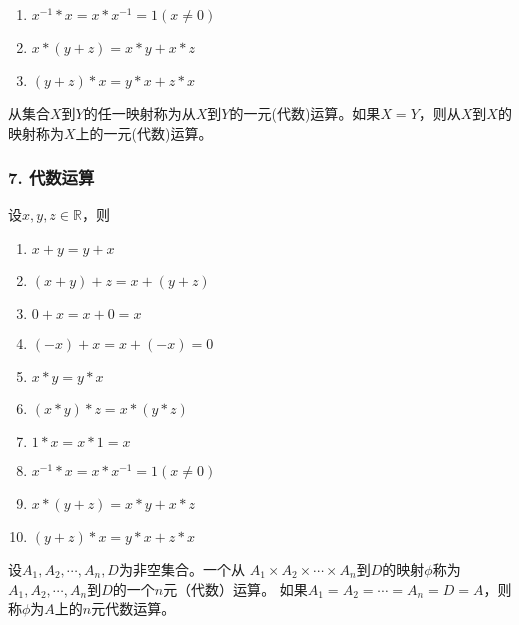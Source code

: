 \documentclass{beamer}
\begin{document}
\begin{CJK*}{UTF8}{gbsn}
\begin{frame}
\begin{minipage}[t]{0.49\linewidth}
\begin{block}{}
\begin{enumerate}
   \item   $x^{-1} * x = x * x^{-1} = 1(x\neq 0)$
   \item   $x* (y + z) = x * y + x * z$
   \item   $(y + z) * x = y * x + z * x$
    \end{enumerate}
  \end{block}\pause
\end{minipage}
\begin{minipage}[t]{0.49\linewidth}
  \begin{Def}
    从集合$X$到$Y$的任一映射称为从$X$到$Y$的\alert{一元(代数)运算}。如果$X=Y$，则从$X$到$X$的映射称为$X$上的\alert{一元(代数)运算}。
  \end{Def}
\end{minipage}
\end{frame}

\begin{frame}
  \frametitle{7. 代数运算}
  \begin{minipage}[t]{0.49\linewidth}
  \begin{block}{}
    设$x, y, z \in \mathbb{R}$，则
   \begin{enumerate}
   \item   $x + y = y + x$
   \item   $(x + y) + z = x + (y + z)$
   \item   $0 + x = x + 0 = x$
   \item   $(-x) + x = x + (-x) = 0$
   \item   $x * y = y * x$
   \item   $(x * y) * z = x * (y *z)$
   \item   $1 * x = x * 1 = x$
   \item   $x^{-1} * x = x * x^{-1} = 1(x\neq 0)$
   \item   $x* (y + z) = x * y + x * z$
   \item   $(y + z) * x = y * x + z * x$
    \end{enumerate}
  \end{block}\pause
\end{minipage}
\begin{minipage}[t]{0.49\linewidth}
  \begin{Def}
    设$A_1, A_2, \cdots, A_n, D$为非空集合。一个从 $A_1\times A_2\times \cdots \times A_n$到$D$的映射$\phi$称为$A_1, A_2, \cdots, A_n$到$D$的一个\alert{$n$元（代数）运算}。
    如果$A_1=A_2=\cdots=A_n=D=A$，则称$\phi$为$A$上的\alert{$n$元代数运算}。
  \end{Def}
\end{minipage}
\end{frame}


\end{CJK*}
\end{document}
